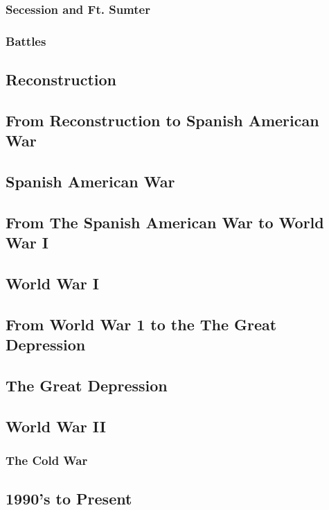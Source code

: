 			\subsubsection{Secession and Ft. Sumter}
			\subsubsection{Battles}
			
		\subsection{Reconstruction}
		\subsection{From Reconstruction to Spanish American War}
		\subsection{Spanish American War}
		\subsection{From The Spanish American War to World War I}
		\subsection {World War I}
		\subsection{From World War 1 to the The Great Depression}
		\subsection{The Great Depression}
		\subsection{World War II}
		\subsubsection{The Cold War}

		\subsection{1990's to Present}
		
		
		
		
			
